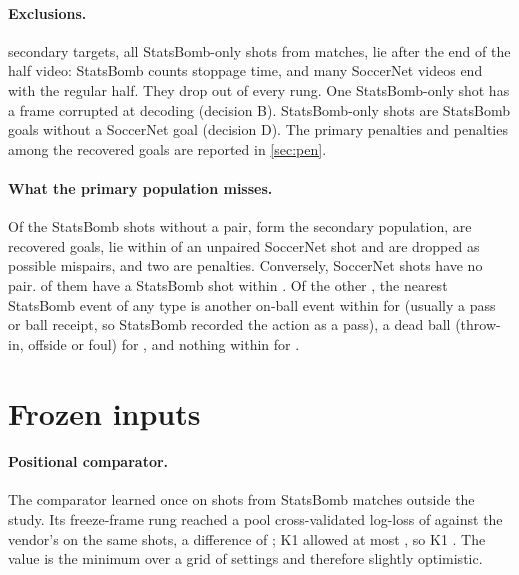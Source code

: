 \documentclass[10pt,twocolumn,letterpaper]{article}
\begin{document}
\paragraph{Exclusions.}  secondary targets, all StatsBomb-only shots from  matches,
lie after the end of the half video: StatsBomb counts stoppage time, and many SoccerNet videos end with the regular
half. They drop out of every rung. One StatsBomb-only shot has a frame corrupted at decoding (decision B).
 StatsBomb-only shots are StatsBomb goals without a SoccerNet goal (decision D). The
 primary penalties and  penalties among the recovered goals are reported in
\cref{sec:pen}.

\paragraph{What the primary population misses.} Of the  StatsBomb shots without a pair,
 form the secondary population,  are recovered goals,  lie within
 of an unpaired SoccerNet shot and are dropped as possible mispairs, and two are penalties.
Conversely,  SoccerNet shots have no pair.  of them have a StatsBomb shot within
. Of the other , the nearest StatsBomb event of any type is another on-ball event
within  for  (usually a pass or ball receipt, so StatsBomb recorded the action as a
pass), a dead ball (throw-in, offside or foul) for , and nothing within  for
.

\section{Frozen inputs}
\label{sec:frozen}

\paragraph{Positional comparator.} The comparator learned once on  shots from 
StatsBomb matches outside the study. Its freeze-frame rung reached a pool cross-validated log-loss of 
against the vendor's  on the same shots, a difference of ; K1 allowed at most
, so K1 . The value is the minimum over a grid of settings and therefore slightly
optimistic.
\end{document}
